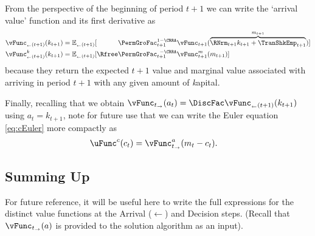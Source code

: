 \documentclass[titlepage, headings=optiontotocandhead]{Resources/texmf-local/tex/latex/econtex}
\begin{document}
From the perspective of the beginning of {period} $t+1$ we can write the `arrival value' function and its first derivative as
  \begin{equation}\begin{gathered}\begin{aligned}
        \vFunc_{_\leftarrow{(t+1)}}({k}_{t+1})    & = \Ex_{_\leftarrow{(t+1)}}[\phantom{\Rfree}\PermGroFac_{t+1}^{1-\CRRA}{\vFunc}_{{t+1}}(\overbrace{\RNrm_{t+1}{k}_{t+1}+{\TranShkEmp}_{t+1}}^{{m}_{t+1}})] \label{eq:vFuncBegtpdefn} \\
        {\vFunc^{{k}}_{_\leftarrow{(t+1)}}}({k}_{t+1}) & = \Ex_{_\leftarrow{(t+1)}}[\Rfree \PermGroFac_{t+1}^{\phantom{1}-\CRRA} {\vFunc}_{{t+1}}^{{m}}({m}_{t+1})]
      \end{aligned}\end{gathered}\end{equation}
because they return the expected $t+1$ value and marginal value associated with arriving in {period} $t+1$ with any given amount of \textit{k}apital.

Finally, recalling that we obtain $\vFunc_{t_\rightarrow}({a}_{t}) = \DiscFac \vFunc_{_\leftarrow{(t+1)}}({k}_{t+1})$ using ${a}_{t} = {k}_{t+1}$, note for future use that we can write the Euler equation \eqref{eq:cEuler} more compactly as
  \begin{equation}\begin{gathered}\begin{aligned}
        \uFunc^{{c}}({c}_{t})   & = \vFunc_{t_\rightarrow}^{{a}}({m}_{t}-{c}_{t}).
        \label{eq:upEqbetaOp}
      \end{aligned}\end{gathered}\end{equation}


\hypertarget{summing-up}{}
\subsection{Summing Up}\label{subsec:summing-up}
For future reference, it will be useful here to write the full expressions for the distinct value functions at the {Arrival} ($\leftarrow$) and {Decision} steps.  (Recall that $\vFunc_{t_\rightarrow}(a)$ is provided to the solution algorithm as an input).
\end{document}
